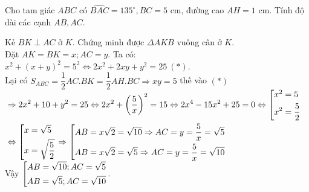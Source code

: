 \begin{ex}%
	Cho tam giác $ABC$ có $\widehat{BAC}=135^\circ, BC=5$ cm, đường cao $AH=1$ cm. Tính độ dài các cạnh $AB,AC$.
\loigiai
    {\begin{center}
    \end{center}
    Kẻ $BK\perp AC$ ở $K$. Chứng minh được $\Delta AKB$ vuông cân ở $K$.\\
    Đặt $AK=BK=x; AC=y$. Ta có: $x^2+(x+y)^2=5^2\Leftrightarrow 2x^2+2xy+y^2=25\ (*)$.\\
    Lại có $S_{ABC}=\dfrac{1}{2}AC.BK=\dfrac{1}{2}AH.BC\Rightarrow xy=5$ thế vào $(*)$\\
    $\begin{aligned}
     &\Rightarrow 2x^2+10+y^2=25\Leftrightarrow 2x^2+\left(\dfrac{5}{x}\right)^2=15\Leftrightarrow 2x^4-15x^2+25=0\Leftrightarrow \left[\begin{aligned}&x^2=5\\&x^2=\dfrac{5}{2}\end{aligned}\right.\\&
     \Leftrightarrow \left[\begin{aligned}&x=\sqrt{5}\\&x=\sqrt{\dfrac{5}{2}}\end{aligned}\right.\Rightarrow \left[\begin{aligned}&AB=x\sqrt{2}=\sqrt{10}\Rightarrow AC=y=\dfrac{5}{x}=\sqrt{5}\\&AB=x\sqrt{2}=\sqrt{5}\Rightarrow AC=y=\dfrac{5}{x}=\sqrt{10}\end{aligned}\right.
    \end{aligned}
   $\\
   Vậy $\left[\begin{aligned}&AB=\sqrt{10}; AC=\sqrt{5}\\&AB=\sqrt{5};AC=\sqrt{10}\end{aligned}\right.$.
    }
\end{ex}
